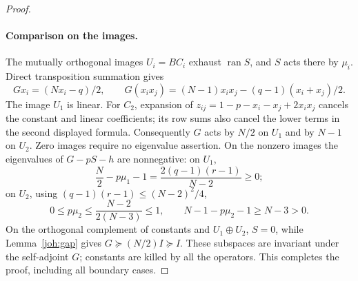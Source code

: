 \begin{proof}
\paragraph{Comparison on the images.}
The mutually orthogonal images $U_i=BC_i$ exhaust $\operatorname{ran}S$, and
$S$ acts there by $\mu_i$. Direct transposition summation gives
\[
 Gx_i=(Nx_i-q)/2,\qquad
 G(x_ix_j)=(N-1)x_ix_j-(q-1)(x_i+x_j)/2.
\]
The image $U_1$ is linear. For $C_2$, expansion of
$z_{ij}=1-p-x_i-x_j+2x_ix_j$ cancels the constant and linear coefficients;
its row sums also cancel the lower terms in the second displayed formula.
Consequently $G$ acts by $N/2$ on $U_1$ and by $N-1$ on $U_2$.
Zero images require no eigenvalue assertion. On the nonzero images the
eigenvalues of $G-pS-h$ are nonnegative: on $U_1$,
\[
 \frac N2-p\mu_1-1=\frac{2(q-1)(r-1)}{N-2}\ge0;
\]
on $U_2$, using $(q-1)(r-1)\le(N-2)^2/4$,
\[
 0\le p\mu_2\le\frac{N-2}{2(N-3)}\le1,\qquad
 N-1-p\mu_2-1\ge N-3>0.
\]
On the orthogonal complement of constants and $U_1\oplus U_2$, $S=0$, while
Lemma~\ref{joh:gap} gives $G\succeq(N/2)I\succeq I$. These subspaces
are invariant under the self-adjoint $G$; constants are killed by all the
operators. This completes the proof, including all boundary cases.
\end{proof}
